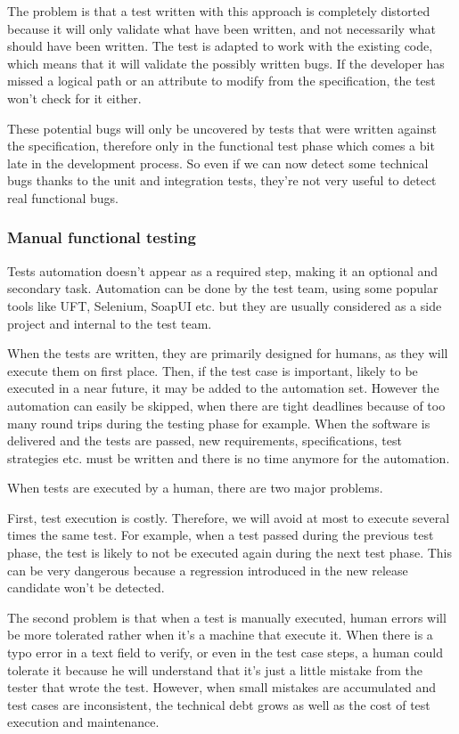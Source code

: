 The problem is that a test written with this approach is completely distorted
because it will only validate what have been written, and not necessarily
what should have been written.
The test is adapted to work with the existing code, which means that it will
validate the possibly written bugs.
If the developer has missed a logical path or an attribute to modify from the
specification, the test won't check for it either.

These potential bugs will only be uncovered by tests that were written against
the specification, therefore only in the functional test phase which comes a bit
late in the development process.
So even if we can now detect some technical bugs thanks to the unit and
integration tests, they're not very useful to detect real functional bugs.

\subsubsection{Manual functional testing}
Tests automation doesn't appear as a required step, making it an
optional and secondary task.
Automation can be done by the test team, using some popular tools like UFT,
Selenium, SoapUI etc.
but they are usually considered as a side project and internal to the test team.

When the tests are written, they are primarily designed for humans, as they
will execute them on first place.
Then, if the test case is important, likely to be executed in a near future,
it may be added to the automation set.
However the automation can easily be skipped, when there are tight
deadlines because of too many round trips during the testing phase for example.
When the software is delivered and the tests are passed, new
requirements, specifications, test strategies etc.
must be written and there is no time anymore for the automation.

When tests are executed by a human, there are two major problems.

First, test execution is costly.
Therefore, we will avoid at most to execute several times the same test.
For example, when a test passed during the previous test phase, the test
is likely to not be executed again during the next test phase.
This can be very dangerous because a regression introduced in the new release
candidate won't be detected.

The second problem is that when a test is manually executed, human errors
will be more tolerated rather when it's a machine that execute it.
When there is a typo error in a text field to verify, or even in the test case
steps, a human could tolerate it because he will understand that it's just a
little mistake from the tester that wrote the test.
However, when small mistakes are accumulated and test cases are inconsistent,
the technical debt grows as well as the cost of test execution and maintenance.

